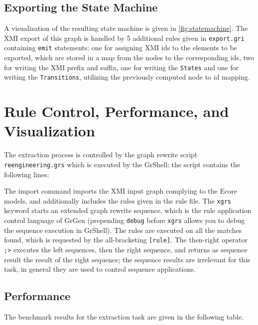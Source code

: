 \documentclass[copyright]{eptcs}
\begin{document}
\subsection{Exporting the State Machine}
A visualization of the resulting state machine is given in \autoref{fig:statemachine}.
The XMI export of this graph is handled by 5 additional rules given in \texttt{export.gri} containing \texttt{emit} statements:
one for assigning XMI ids to the elements to be exported, which are stored in a map from the nodes to the corresponding ids, two for writing the XMI prefix and suffix, one for writing the \texttt{States} and one for writing the \texttt{Transitions}, utilizing the previously computed node to id mapping.


\section{Rule Control, Performance, and Visualization}

The extraction process is controlled by the graph rewrite script \texttt{reengineering.grs} which is executed by the GrShell;
the script contains the following lines:



The import command imports the XMI input graph complying to the Ecore models, and additionally includes the rules given in the rule file.
The \texttt{xgrs} keyword starts an extended graph rewrite sequence, which is the rule application control language of GrGen
(prepending \texttt{debug} before \texttt{xgrs} allows you to debug the sequence execution in GrShell).
The rules are executed on all the matches found, which is requested by the all-bracketing \texttt{[rule]}.
The then-right operator \texttt{;>} executes the left sequences, then the right sequence, and returns as sequence result the result of the right sequence;
the sequence results are irrelevant for this task, in general they are used to control sequence applications.


\subsection{Performance}

The benchmark results for the extraction task are given in the following table.
\end{document}

